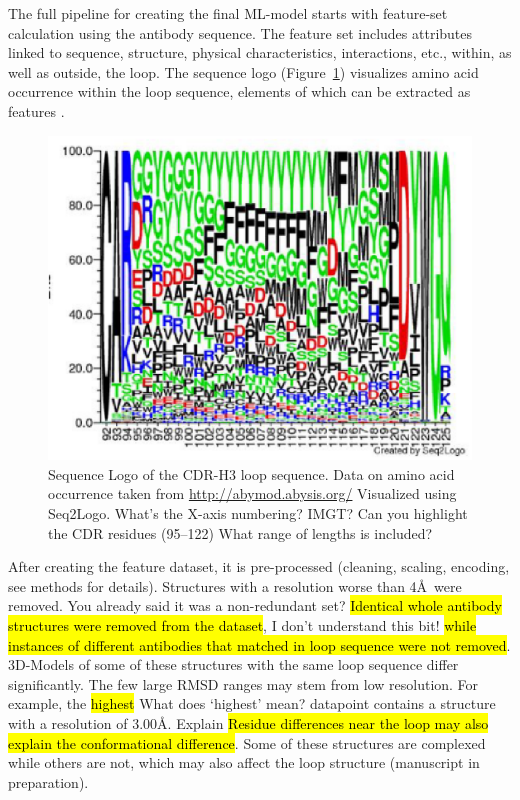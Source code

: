 \documentclass[12pt]{article}
\newcommand{\lilian}[1]{ {\color{red}{\bfseries Lilian:} #1}}
\newcommand{\highlight}[1]{\hl{#1}}
\begin{document}
The full pipeline for creating the final ML-model
starts with 
feature-set calculation using the antibody sequence. The feature set
includes attributes linked to sequence, structure, physical
characteristics, interactions, etc., within, as well as outside, the
loop. 
The sequence logo (Figure~\ref{fig:logo}) visualizes amino acid
occurrence within the loop sequence, elements of which can be
extracted as features \cite{Thomsen2012,Shaner1993}.

\begin{figure}
  \centering
  \includegraphics[width=\linewidth]{logo.eps}
  \caption {Sequence Logo of the CDR-H3 loop sequence. Data on amino
    acid occurrence taken from \protect\url{http://abymod.abysis.org/} Visualized
    using Seq2Logo. \lilian{What's the X-axis numbering? IMGT? Can you highlight the CDR residues (95--122) What range of lengths is included?}}
  \label{fig:logo}
\end{figure}

After creating the feature dataset, it is pre-processed (cleaning,
scaling, encoding, see methods for details). Structures with a
resolution worse than 4\AA\ were removed.
\lilian{You already said it was a non-redundant set?} \highlight{Identical
whole antibody structures were removed from the dataset}, \lilian{I don't understand this bit!} \highlight{while
instances of different antibodies that matched in loop sequence were
not removed}. 3D-Models of some of these structures with the same loop
sequence differ significantly. The few large RMSD ranges may stem from
low resolution. For example, the \highlight{highest} \lilian{What does `highest' mean?} datapoint contains a structure with a
resolution of 3.00\AA.  \lilian{Explain} \highlight{Residue differences near the loop may also
explain the conformational difference}. Some of these structures are
complexed while others are not, which may also affect the loop
structure (manuscript in preparation).
\end{document}
